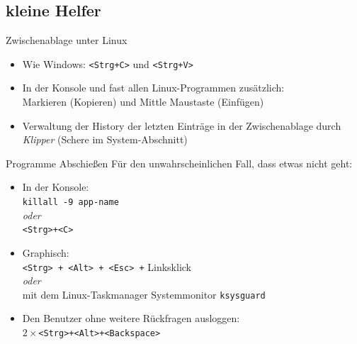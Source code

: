 \subsection{kleine Helfer}



\begin{frame}{Zwischenablage unter Linux}
  \begin{itemize}
    \item Wie Windows: \texttt{<Strg+C>} und \texttt{<Strg+V>}
    \item In der Konsole und fast allen Linux-Programmen zusätzlich: \\
          Markieren (Kopieren) und Mittle Maustaste (Einfügen)
    \item Verwaltung der History der letzten Einträge in der Zwischenablage
          durch \textit{Klipper} (Schere im System-Abschnitt)
  \end{itemize}
\end{frame}

\begin{frame}{Programme Abschießen}
  Für den unwahrscheinlichen Fall, dass etwas nicht geht:
  \begin{itemize}
    \item In der Konsole: \\ \texttt{killall -9 app-name} \\ \textit{oder} \\
    \texttt{<Strg>+<C>}
    \item Graphisch: \\ \texttt{<Strg> + <Alt> + <Esc> +} Linksklick \\
          \textit{oder} \\
          mit dem Linux-Taskmanager Systemmonitor \texttt{ksysguard}
    \item Den Benutzer ohne weitere Rückfragen ausloggen: \\
          $2 \times$\texttt{<Strg>+<Alt>+<Backspace>}
  \end{itemize}
\end{frame}

